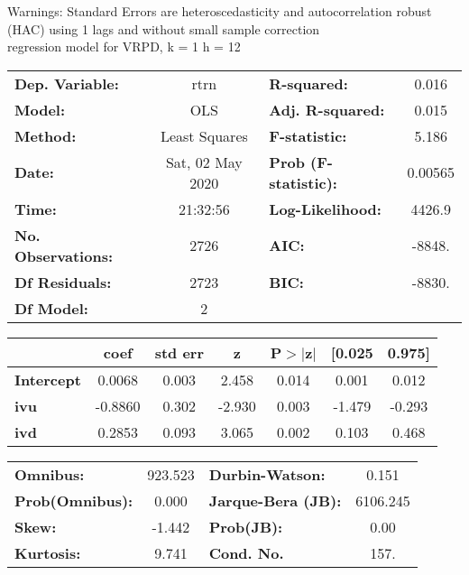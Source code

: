 Warnings: \newline
 [1] Standard Errors are heteroscedasticity and autocorrelation robust (HAC) using 1 lags and without small sample correction\\ 

regression model for VRPD, k = 1 h = 12\begin{center}
\begin{tabular}{lclc}
\toprule
\textbf{Dep. Variable:}    &       rtrn       & \textbf{  R-squared:         } &     0.016   \\
\textbf{Model:}            &       OLS        & \textbf{  Adj. R-squared:    } &     0.015   \\
\textbf{Method:}           &  Least Squares   & \textbf{  F-statistic:       } &     5.186   \\
\textbf{Date:}             & Sat, 02 May 2020 & \textbf{  Prob (F-statistic):} &  0.00565    \\
\textbf{Time:}             &     21:32:56     & \textbf{  Log-Likelihood:    } &    4426.9   \\
\textbf{No. Observations:} &        2726      & \textbf{  AIC:               } &    -8848.   \\
\textbf{Df Residuals:}     &        2723      & \textbf{  BIC:               } &    -8830.   \\
\textbf{Df Model:}         &           2      & \textbf{                     } &             \\
\bottomrule
\end{tabular}
\begin{tabular}{lcccccc}
                   & \textbf{coef} & \textbf{std err} & \textbf{z} & \textbf{P$> |$z$|$} & \textbf{[0.025} & \textbf{0.975]}  \\
\midrule
\textbf{Intercept} &       0.0068  &        0.003     &     2.458  &         0.014        &        0.001    &        0.012     \\
\textbf{ivu}       &      -0.8860  &        0.302     &    -2.930  &         0.003        &       -1.479    &       -0.293     \\
\textbf{ivd}       &       0.2853  &        0.093     &     3.065  &         0.002        &        0.103    &        0.468     \\
\bottomrule
\end{tabular}
\begin{tabular}{lclc}
\textbf{Omnibus:}       & 923.523 & \textbf{  Durbin-Watson:     } &    0.151  \\
\textbf{Prob(Omnibus):} &   0.000 & \textbf{  Jarque-Bera (JB):  } & 6106.245  \\
\textbf{Skew:}          &  -1.442 & \textbf{  Prob(JB):          } &     0.00  \\
\textbf{Kurtosis:}      &   9.741 & \textbf{  Cond. No.          } &     157.  \\
\bottomrule
\end{tabular}
\end{center}

